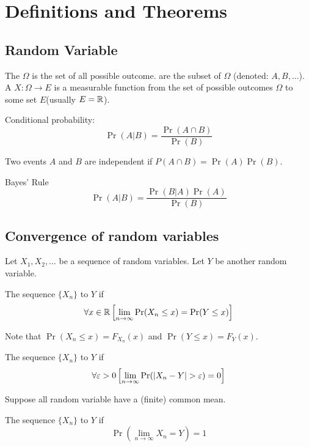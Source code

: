 \section{Definitions and Theorems}
\subsection{Random Variable}

The  $\Omega$ is the set of all possible outcome.
 are the subset of $\Omega$ (denoted: $A, B, \ldots$).
A  $X:\Omega\to E$ is a measurable function
from the set of possible outcomes $\Omega$ to some set $E$(usually $E={\mathbb R}$).









Conditional probability:
\[\Pr(A|B)=\frac{\Pr(A\cap B)}{\Pr(B)}\]

Two events $A$ and $B$ are independent if $P(A\cap B)=\Pr(A)\Pr(B)$.

Bayes' Rule
\[\Pr(A|B)=\frac{\Pr(B|A)\Pr(A)}{\Pr(B)}\]


\subsection{Convergence of random variables}
	Let $X_1, X_2, \ldots$ be a sequence of random variables.
	Let $Y$ be another random variable.

	The sequence $\{X_n\}$  to $Y$  if
	\[\forall x\in{\mathbb R} \left[\lim_{n\to\infty} \Pr(X_n\leq x) = \Pr(Y\leq x)\right]\]

	Note that $\Pr(X_n\leq x) = F_{X_n}(x)$ and $\Pr(Y\leq x) = F_Y(x)$.

	The sequence $\{X_n\}$  to $Y$  if
	\[\forall \eps > 0 \left[\lim_{n\to\infty} \Pr(|X_n-Y|>\eps) = 0\right]\]

	Suppose all random variable have a (finite) common mean.

	The sequence $\{X_n\}$  to $Y$  if
	\[\Pr\left(\lim_{n\to\infty} X_n = Y\right) = 1\]

